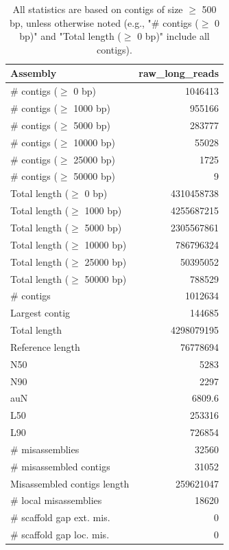 \documentclass[12pt,a4paper]{article}
\begin{document}
\begin{table}[ht]
\begin{center}
\caption{All statistics are based on contigs of size $\geq$ 500 bp, unless otherwise noted (e.g., "\# contigs ($\geq$ 0 bp)" and "Total length ($\geq$ 0 bp)" include all contigs).}
\begin{tabular}{|l*{1}{|r}|}
\hline
Assembly & raw\_long\_reads \\ \hline
\# contigs ($\geq$ 0 bp) & 1046413 \\ \hline
\# contigs ($\geq$ 1000 bp) & 955166 \\ \hline
\# contigs ($\geq$ 5000 bp) & 283777 \\ \hline
\# contigs ($\geq$ 10000 bp) & 55028 \\ \hline
\# contigs ($\geq$ 25000 bp) & 1725 \\ \hline
\# contigs ($\geq$ 50000 bp) & 9 \\ \hline
Total length ($\geq$ 0 bp) & 4310458738 \\ \hline
Total length ($\geq$ 1000 bp) & 4255687215 \\ \hline
Total length ($\geq$ 5000 bp) & 2305567861 \\ \hline
Total length ($\geq$ 10000 bp) & 786796324 \\ \hline
Total length ($\geq$ 25000 bp) & 50395052 \\ \hline
Total length ($\geq$ 50000 bp) & 788529 \\ \hline
\# contigs & 1012634 \\ \hline
Largest contig & 144685 \\ \hline
Total length & 4298079195 \\ \hline
Reference length & 76778694 \\ \hline
N50 & 5283 \\ \hline
N90 & 2297 \\ \hline
auN & 6809.6 \\ \hline
L50 & 253316 \\ \hline
L90 & 726854 \\ \hline
\# misassemblies & 32560 \\ \hline
\# misassembled contigs & 31052 \\ \hline
Misassembled contigs length & 259621047 \\ \hline
\# local misassemblies & 18620 \\ \hline
\# scaffold gap ext. mis. & 0 \\ \hline
\# scaffold gap loc. mis. & 0 \\ \hline

\end{tabular}
\end{center}
\end{table}
\end{document}
